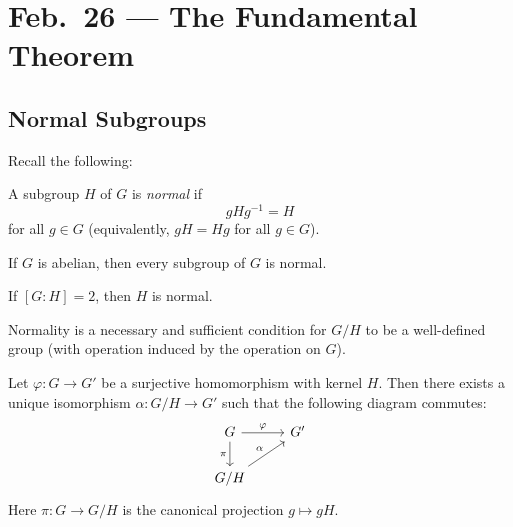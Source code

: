 \chapter{Feb.~26 --- The Fundamental Theorem}

\section{Normal Subgroups}

Recall the following:

\begin{definition}
  A subgroup $H$ of $G$ is \emph{normal} if
  \[
    gHg^{-1} = H
  \]
  for all $g \in G$ (equivalently, $gH = Hg$ for all
  $g \in G$).
\end{definition}

\begin{remark}
  If $G$ is abelian, then every subgroup of $G$ is normal.
\end{remark}

\begin{exercise}
  If $[G : H] = 2$, then $H$ is normal.
\end{exercise}

\begin{remark}
  Normality is a necessary and sufficient condition for
  $G / H$ to be a well-defined group (with operation
  induced by the operation on $G$).
\end{remark}

\begin{theorem}
  Let $\varphi : G \to G'$ be a surjective homomorphism
  with kernel $H$. Then there exists a unique isomorphism
  $\alpha : G / H \to G'$ such that the following diagram
  commutes:
  \[
    \begin{tikzcd}
      G \arrow{r}{\varphi} \arrow[swap]{d}{\pi}
      & G' \\
      G / H \arrow{ur}{\alpha}
    \end{tikzcd}
  \]
  Here $\pi : G \to G / H$ is the canonical projection
  $g \mapsto gH$.
\end{theorem}

